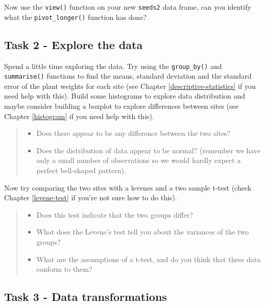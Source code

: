 \documentclass[
]{book}
\providecommand{\tightlist}{%
  \setlength{\itemsep}{0pt}\setlength{\parskip}{0pt}}
\begin{document}
Now use the \texttt{view()} function on your new \texttt{seeds2} data frame, can you identify what the \texttt{pivot\_longer()} function has done?

\hypertarget{c7t2}{%
\subsection{Task 2 - Explore the data}\label{c7t2}}

Spend a little time exploring the data. Try using the \texttt{group\_by()} and \texttt{summarise()} functions to find the means, standard deviation and the standard error of the plant weights for each site (see Chapter \ref{descriptive-statistics} if you need help with this). Build some histograms to explore data distribution and maybe consider building a boxplot to explore differences between sites (see Chapter \ref{histogram} if you need help with this).

\begin{quote}
\begin{itemize}
\tightlist
\item
  Does there appear to be any difference between the two sites?
\item
  Does the distribution of data appear to be normal? (remember we have only a small number of observations so we would hardly expect a perfect bell-shaped pattern).
\end{itemize}
\end{quote}

Now try comparing the two sites with a levenes and a two sample t-test (check Chapter \ref{levene-test} if you're not sure how to do this).

\begin{quote}
\begin{itemize}
\tightlist
\item
  Does this test indicate that the two groups differ?
\item
  What does the Levene's test tell you about the variances of the two groups?
\item
  What are the assumptions of a t-test, and do you think that these data conform to them?
\end{itemize}
\end{quote}

\hypertarget{c7t3}{%
\subsection{Task 3 - Data transformations}\label{c7t3}}
\end{document}
